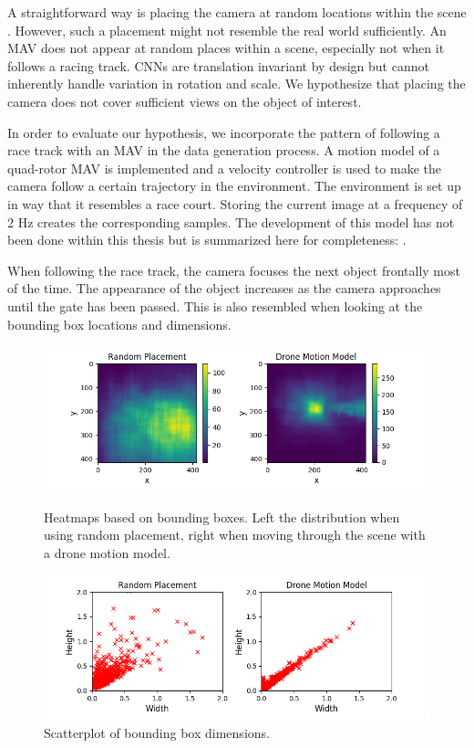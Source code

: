 A straightforward way is placing the camera at random locations within the scene . However, such a placement might not resemble the real world sufficiently. An \ac{MAV} does not appear at random places within a scene, especially not when it follows a racing track. \acp{CNN} are translation invariant by design but cannot inherently handle variation in rotation and scale. We hypothesize that placing the camera does not cover sufficient views on the object of interest. 

In order to evaluate our hypothesis, we incorporate the pattern of following a race track with an \ac{MAV} in the data generation process. A motion model of a quad-rotor \ac{MAV} is implemented and a velocity controller is used to make the camera follow a certain trajectory in the environment. The environment is set up in way that it resembles a race court.  Storing the current image at a frequency of 2 Hz creates the corresponding samples. The development of this model has not been done within this thesis but is summarized here for completeness: . 

When following the race track, the camera focuses the next object frontally most of the time. The appearance of the object increases as the camera approaches until the gate has been passed. This is also resembled when looking at the bounding box locations and dimensions.

\begin{figure}
	\begin{minipage}{\textwidth}
		\includegraphics[width=\textwidth]{fig/heatmap_camplace}
		\caption{Heatmaps based on bounding boxes. Left the distribution when using random placement, right when moving through the scene with a drone motion model.}
		\label{fig:heatmap_camplace}
	\end{minipage}
	\begin{minipage}{\textwidth}
		\includegraphics[width=\textwidth]{fig/aspect_ratios_camplace}
		\caption{Scatterplot of bounding box dimensions.}
		\label{fig:scatter_camplace}
	\end{minipage}
\end{figure}


